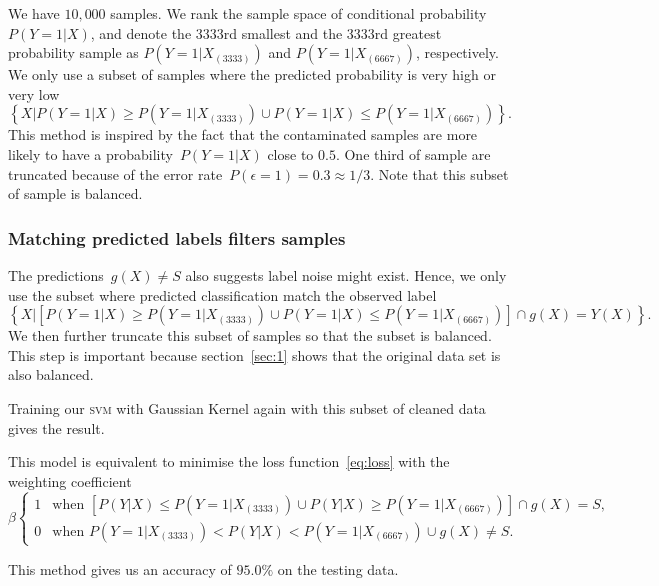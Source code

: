 \documentclass[12pt]{article} %
\begin{document}
We have $10,000$ samples.
We rank the sample space of conditional probability~$P(Y=1|X)$, and denote the $3333$rd smallest and the $3333$rd greatest probability sample as $P(Y=1|X_{(3333)})$ and $P(Y=1|X_{(6667)})$, respectively. 
We only use a subset of samples where the predicted probability is very high or very low 
\begin{equation*}
\left\{X|P(Y=1|X)\geq P(Y=1|X_{(3333)}) \cup P(Y=1|X)\leq P(Y=1|X_{(6667)}) \right\}.
\end{equation*}
This method is inspired by the fact that the contaminated samples are more likely to have a probability~$P(Y=1|X)$ close to $0.5$. One third of sample are truncated because of the error rate~$P(\epsilon=1)=0.3\approx 1/3$. Note that this subset of sample is balanced.

\subsubsection{Matching predicted labels filters samples}
The predictions~$g(X)\neq S$ also suggests label noise might exist. Hence, we only use the subset where predicted classification match the observed label
\begin{equation*}
\left\{X|\left[P(Y=1|X)\geq P(Y=1|X_{(3333)}) \cup P(Y=1|X)\leq P(Y=1|X_{(6667)})\right] \cap g(X)=Y(X) \right\}.
\end{equation*}
We then further truncate this subset of samples so that the subset is balanced. This step is important because section~\ref{sec:1} shows that the original data set is also balanced.

Training our \textsc{svm} with Gaussian Kernel again with this subset of cleaned data gives the result.

This model is equivalent to minimise the loss function~\eqref{eq:loss} with the weighting coefficient
\begin{equation*}
\beta\begin{cases}
1 & \text{when }\left[P({Y}|X)\leq P(Y=1|X_{(3333)}) \cup P({Y}|X)\geq P(Y=1|X_{(6667)})\right] \cap g(X)=S,\\
0 & \text{when }P(Y=1|X_{(3333)})<P({Y}|X)<P(Y=1|X_{(6667)})\cup g(X)\neq S.
\end{cases}
\end{equation*}


This method gives us an accuracy of $95.0\%$ on the testing data.
\end{document}
